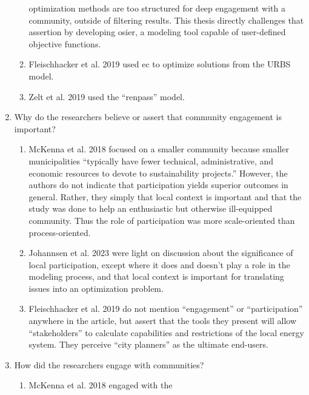 \begin{enumerate}
\begin{enumerate}
        optimization methods are too structured for deep engagement with a
        community, outside of filtering results. This thesis directly challenges
        that assertion by developing \ac{osier}, a modeling tool capable of
        user-defined objective functions.
        \item Fleischhacker et al. 2019 \cite{fleischhacker_portfolio_2019} used
        \acf{ec} to optimize solutions from the URBS model.
        \item Zelt et al. 2019 \cite{zelt_long-term_2019} used the ``renpass'' model.
    \end{enumerate}
    \item Why do the researchers believe or assert that community engagement is
    important?
    \begin{enumerate}
        \item McKenna et al. 2018 \cite{mckenna_combining_2018} focused on a
        smaller community because smaller municipalities ``typically have fewer
        technical, administrative, and economic resources to devote to
        sustainability projects.'' However, the authors do not indicate that
        participation yields superior outcomes in general. Rather, they simply
        that local context is important and that the study was done to help an
        enthusiastic but otherwise ill-equipped community. Thus the role of
        participation was more scale-oriented than process-oriented.
        \item Johannsen et al. 2023 \cite{johannsen_municipal_2023} were light
        on discussion about the significance of local participation, except
        where it does and doesn't play a role in the modeling process, and that
        local context is important for translating issues into an optimization
        problem.
        \item Fleischhacker et al. 2019 \cite{fleischhacker_portfolio_2019} do
        not mention ``engagement'' or ``participation'' anywhere in the article,
        but assert that the tools they present will allow ``stakeholders'' to
        calculate capabilities and restrictions of the local energy system. They
        perceive ``city planners'' as the ultimate end-users.
    \end{enumerate}
    \item How did the researchers engage with communities?
    \begin{enumerate}
        \item McKenna et al. 2018 \cite{mckenna_combining_2018} engaged with the

\end{enumerate}
\end{enumerate}
